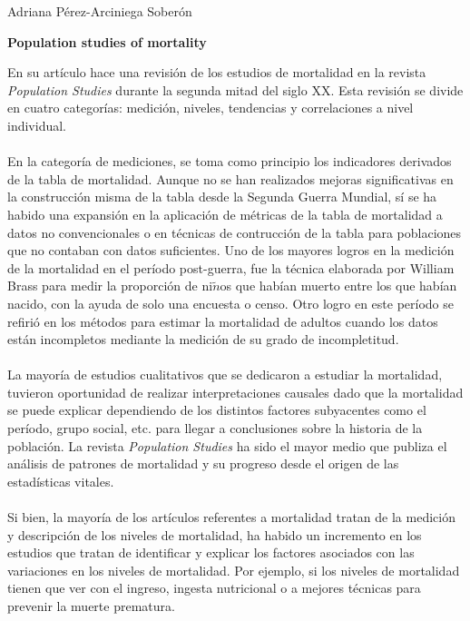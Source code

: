 \documentclass[10pt,spanish,letterpaper]{article}
\theoremstyle{plain}
\begin{document}
\begin{flushleft}
Adriana P\'erez-Arciniega Sober\'on
\end{flushleft}
\begin{center}
\textbf{Population studies of mortality}
\end{center}
En su art\'iculo \cite{preston1996population} hace una revisi\'on de los estudios de mortalidad en la revista \textit{Population Studies} durante la segunda mitad del siglo XX. Esta revisi\'on se divide en cuatro categor\'ias: medici\'on, niveles, tendencias y correlaciones a nivel individual.\\
\\
En la categor\'ia de mediciones, se toma como principio los indicadores derivados de la tabla de mortalidad. Aunque no se han realizados mejoras significativas en la construcci\'on misma de la tabla desde la Segunda Guerra Mundial, s\'i se ha habido una expansi\'on en la aplicaci\'on de m\'etricas de la tabla de mortalidad a datos no convencionales o en t\'ecnicas de contrucci\'on de la tabla para poblaciones que no contaban con datos suficientes. Uno de los mayores logros en la medici\'on de la mortalidad en el per\'iodo post-guerra, fue la t\'ecnica elaborada por William Brass para medir la proporci\'on de ni$\tilde{n}$os que hab\'ian muerto entre los que hab\'ian nacido, con la ayuda de solo una encuesta o censo. Otro logro en este per\'iodo se refiri\'o en los m\'etodos para estimar la mortalidad de adultos cuando los datos est\'an incompletos mediante la medici\'on de su grado de incompletitud.\\
\\
La mayor\'ia de estudios cualitativos que se dedicaron a estudiar la mortalidad, tuvieron oportunidad de realizar interpretaciones causales dado que la mortalidad se puede explicar dependiendo de los distintos factores subyacentes como el per\'iodo, grupo social, etc. para llegar a conclusiones sobre la historia de la poblaci\'on. La revista \textit{Population Studies} ha sido el mayor medio que publiza el an\'alisis de patrones de mortalidad y su progreso desde el origen de las estad\'isticas vitales.\\
\\
Si bien, la mayor\'ia de los art\'iculos referentes a mortalidad tratan de la medici\'on y descripci\'on de los niveles de mortalidad, ha habido un incremento en los estudios que tratan de identificar y explicar los factores asociados con las variaciones en los niveles de mortalidad. Por ejemplo, si los niveles de mortalidad tienen que ver con el ingreso, ingesta nutricional o a mejores t\'ecnicas para prevenir la muerte prematura.\\
\end{document}
